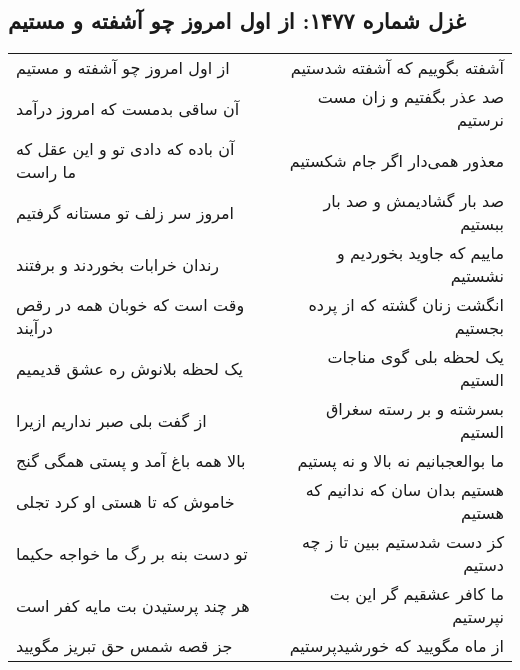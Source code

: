\begin{center}
\section*{غزل شماره ۱۴۷۷: از اول امروز چو آشفته و مستیم}
\label{sec:1477}
\begin{longtable}{l p{0.5cm} r}
از اول امروز چو آشفته و مستیم
&&
آشفته بگوییم که آشفته شدستیم
\\
آن ساقی بدمست که امروز درآمد
&&
صد عذر بگفتیم و زان مست نرستیم
\\
آن باده که دادی تو و این عقل که ما راست
&&
معذور همی‌دار اگر جام شکستیم
\\
امروز سر زلف تو مستانه گرفتیم
&&
صد بار گشادیمش و صد بار ببستیم
\\
رندان خرابات بخوردند و برفتند
&&
ماییم که جاوید بخوردیم و نشستیم
\\
وقت است که خوبان همه در رقص درآیند
&&
انگشت زنان گشته که از پرده بجستیم
\\
یک لحظه بلانوش ره عشق قدیمیم
&&
یک لحظه بلی گوی مناجات الستیم
\\
از گفت بلی صبر نداریم ازیرا
&&
بسرشته و بر رسته سغراق الستیم
\\
بالا همه باغ آمد و پستی همگی گنج
&&
ما بوالعجبانیم نه بالا و نه پستیم
\\
خاموش که تا هستی او کرد تجلی
&&
هستیم بدان سان که ندانیم که هستیم
\\
تو دست بنه بر رگ ما خواجه حکیما
&&
کز دست شدستیم ببین تا ز چه دستیم
\\
هر چند پرستیدن بت مایه کفر است
&&
ما کافر عشقیم گر این بت نپرستیم
\\
جز قصه شمس حق تبریز مگویید
&&
از ماه مگویید که خورشیدپرستیم
\\
\end{longtable}
\end{center}

